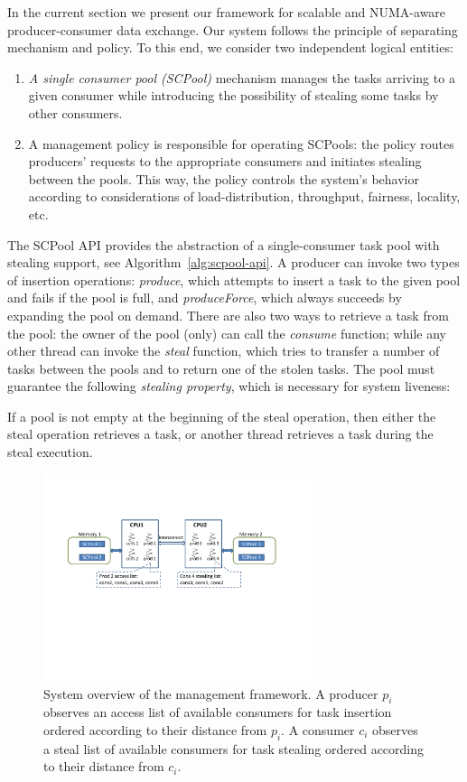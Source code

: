 In the current section we present our framework for scalable and NUMA-aware producer-consumer data exchange. 
Our system follows the principle of separating mechanism and policy.
To this end, we consider two independent logical entities: 
\begin{enumerate}
	\item \emph{A single consumer pool (SCPool)} mechanism manages the tasks arriving to a given consumer while introducing the possibility of stealing some tasks by other consumers.
	\item A management policy is responsible for operating SCPools: the policy routes producers' requests to the appropriate consumers and initiates stealing between the pools. This way, the policy controls the system's behavior according to considerations of load-distribution, throughput, fairness, locality, etc.
\end{enumerate} 



The SCPool API provides the abstraction of a single-consumer task pool with stealing support, see Algorithm~\ref{alg:scpool-api}.
A producer can invoke two types of insertion operations: \emph{produce}, which attempts to insert a task to the given pool and fails if the pool is full, and \emph{produceForce}, which always succeeds by expanding the pool on demand.
There are also two ways to retrieve a task from the pool: the owner of the pool (only) can call the \emph{consume} function; while any other thread can invoke the \emph{steal} function, which tries to transfer a number of tasks between the pools and to return one of the stolen tasks. 
The pool must guarantee the following \emph{stealing property}, which is necessary for system liveness:
\begin{property}
If a pool is not empty at the beginning of the steal operation, then either the steal operation retrieves a task, or another thread retrieves a task during the steal execution.
\end{property}

\begin{figure}[htb]
	\centering
	\includegraphics[width=0.7\textwidth]{figures/system-fig}
	\caption{\footnotesize{System overview of the management framework. A producer $p_i$ observes an access list of available consumers for task insertion ordered according to their distance from $p_i$. A consumer $c_i$ observes a steal list of available consumers for task stealing ordered according to their distance from $c_i$. }}
	\label{fig:system-fig}
\end{figure}

